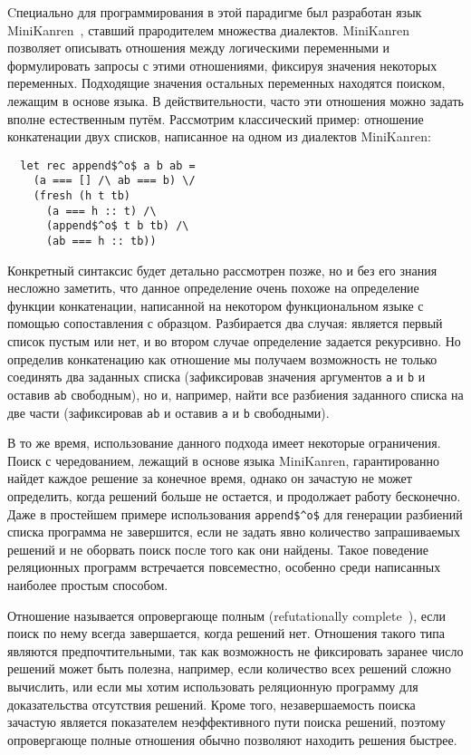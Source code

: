     Cпециально для программирования в этой парадигме был разработан язык MiniKanren~\cite{TRS}, ставший прародителем множества диалектов. MiniKanren позволяет описывать отношения между логическими переменными и формулировать запросы с этими отношениями, фиксируя значения некоторых переменных. Подходящие значения остальных переменных находятся поиском, лежащим в основе языка. В действительности, часто эти отношения можно задать вполне естественным путём. Рассмотрим классический пример: отношение конкатенации двух списков, написанное на одном из диалектов MiniKanren:

\begin{lstlisting}
  let rec append$^o$ a b ab =
    (a === [] /\ ab === b) \/
    (fresh (h t tb)
      (a === h :: t) /\
      (append$^o$ t b tb) /\
      (ab === h :: tb))
\end{lstlisting}

    Конкретный синтаксис будет детально рассмотрен позже, но и без его знания несложно заметить, что данное определение очень похоже на определение функции конкатенации, написанной на некотором функциональном языке с помощью сопоставления с образцом. Разбирается два случая: является первый список пустым или нет, и во втором случае определение задается рекурсивно. Но определив конкатенацию как отношение мы получаем возможность не только соединять два заданных списка (зафиксировав значения аргументов \lstinline|a| и \lstinline|b| и оставив \lstinline|ab| свободным), но и, например, найти все разбиения заданного списка на две части (зафиксировав \lstinline|ab| и оставив \lstinline|a| и \lstinline|b| свободными).

    В то же время, использование данного подхода имеет некоторые ограничения. Поиск с чередованием, лежащий в основе языка MiniKanren, гарантированно найдет каждое решение за конечное время, однако он зачастую не может определить, когда решений больше не остается, и продолжает работу бесконечно. Даже в простейшем примере использования \lstinline|append$^o$| для генерации разбиений списка программа не завершится, если не задать явно количество запрашиваемых решений и не оборвать поиск после того как они найдены. Такое поведение реляционных программ встречается повсеместно, особенно среди написанных наиболее простым способом.

    Отношение называется опровергающе полным (refutationally complete~\cite{WillThesis}), если поиск по нему всегда завершается, когда решений нет. Отношения такого типа являются предпочтительными, так как возможность не фиксировать заранее число решений может быть полезна, например, если количество всех решений сложно вычислить, или если мы хотим использовать реляционную программу для доказательства отсутствия решений. Кроме того, незавершаемость поиска зачастую является показателем неэффективного пути поиска решений, поэтому опровергающе полные отношения обычно позволяют находить решения быстрее.

